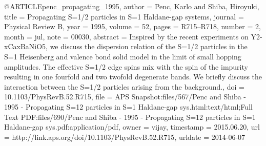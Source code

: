 @ARTICLE{penc_propagating_1995,
  author = {Penc, Karlo and Shiba, Hiroyuki},
  title = {Propagating {S}=1/2 particles in {S}=1 {Haldane}-gap systems},
  journal = {Physical Review B},
  year = {1995},
  volume = {52},
  pages = {R715--R718},
  number = {2},
  month = jul,
  note = {00030},
  abstract = {Inspired by the recent experiments on Y2-xCaxBaNiO5, we discuss the
	dispersion relation of the S=1/2 particles in the S=1 Heisenberg
	and valence bond solid model in the limit of small hopping amplitudes.
	The effective S=1/2 edge spins mix with the spin of the impurity
	resulting in one fourfold and two twofold degenerate bands. We briefly
	discuss the interaction between the S=1/2 particles arising from
	the background.},
  doi = {10.1103/PhysRevB.52.R715},
  file = {APS Snapshot:files/567/Penc and Shiba - 1995 - Propagating S=12 particles in S=1 Haldane-gap sys.html:text/html;Full Text PDF:files/690/Penc and Shiba - 1995 - Propagating S=12 particles in S=1 Haldane-gap sys.pdf:application/pdf},
  owner = {vijay},
  timestamp = {2015.06.20},
  url = {http://link.aps.org/doi/10.1103/PhysRevB.52.R715},
  urldate = {2014-06-07}
}

